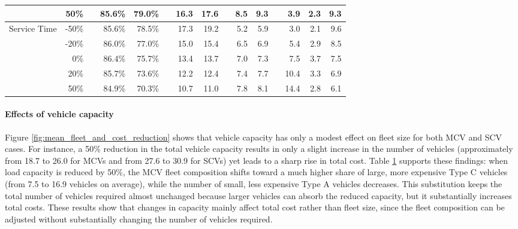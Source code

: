 \documentclass[11pt]{elsarticle}
\theoremstyle{plain}
\begin{document}
\begin{table}[htbp]
{\begin{tabular}{lrrrrcrrrrrrrrr}
          & 50\%  &       & 85.6\% & 79.0\% &       & 16.3  & 17.6  &       & 8.5   & 9.3   &       & 3.9   & 2.3   & 9.3 \\
    \midrule 
    \multirow{5}[2]{*}{Service Time} & -50\% &       & 85.6\% & 78.5\% &       & 17.3  & 19.2  &       & 5.2   & 5.9   &       & 3.0   & 2.1   & 9.6 \\
          & -20\% &       & 86.0\% & 77.0\% &       & 15.0  & 15.4  &       & 6.5   & 6.9   &       & 5.4   & 2.9   & 8.5 \\
          & 0\%   &       & 86.4\% & 75.7\% &       & 13.4  & 13.7  &       & 7.0   & 7.3   &       & 7.5   & 3.7   & 7.5 \\
          & 20\%  &       & 85.7\% & 73.6\% &       & 12.2  & 12.4  &       & 7.4   & 7.7   &       & 10.4  & 3.3   & 6.9 \\
          & 50\%  &       & 84.9\% & 70.3\% &       & 10.7  & 11.0  &       & 7.8   & 8.1   &       & 14.4  & 2.8   & 6.1 \\
    \bottomrule
    \end{tabular}%
    }
  \label{tab:sensitivity_analysis}%
\end{table}%

\paragraph{Effects of vehicle capacity} 
Figure \ref{fig:mean_fleet_and_cost_reduction} shows that vehicle capacity has only a modest effect on fleet size for both \ac{MCV} and \ac{SCV} cases. For instance, a 50\% reduction in the total vehicle capacity results in only a slight increase in the number of vehicles (approximately from 18.7 to 26.0 for \acp{MCV} and from 27.6 to 30.9 for \acp{SCV}) yet leads to a sharp rise in total cost. 
Table \ref{tab:sensitivity_analysis} supports these findings: when load capacity is reduced by 50\%, the \ac{MCV} fleet composition shifts toward a much higher share of large, more expensive Type C vehicles (from 7.5 to 16.9 vehicles on average), while the number of small, less expensive Type A vehicles decreases. 
This substitution keeps the total number of vehicles required almost unchanged because larger vehicles can absorb the reduced capacity, but it substantially increases total costs.
These results show that changes in capacity mainly affect total cost rather than fleet size, since the fleet composition can be adjusted without substantially changing the number of vehicles required.
\end{document}
